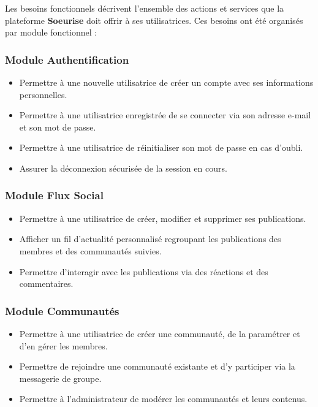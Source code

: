 \documentclass[12pt,a4paper]{report}
\begin{document}
	Les besoins fonctionnels décrivent l'ensemble des actions et services que la 
	plateforme \textbf{Soeurise} doit offrir à ses utilisatrices. Ces besoins ont été 
	organisés par module fonctionnel :
	
	\subsubsection*{Module Authentification}
	\begin{itemize}
		\item Permettre à une nouvelle utilisatrice de créer un compte avec ses 
		informations personnelles.
		\item Permettre à une utilisatrice enregistrée de se connecter via son 
		adresse e-mail et son mot de passe.
		\item Permettre à une utilisatrice de réinitialiser son mot de passe 
		en cas d'oubli.
		\item Assurer la déconnexion sécurisée de la session en cours.
	\end{itemize}
	
	\subsubsection*{Module Flux Social}
	\begin{itemize}
		\item Permettre à une utilisatrice de créer, modifier et supprimer 
		ses publications.
		\item Afficher un fil d'actualité personnalisé regroupant les publications 
		des membres et des communautés suivies.
		\item Permettre d'interagir avec les publications via des réactions 
		et des commentaires.
	\end{itemize}
	
	\subsubsection*{Module Communautés}
	\begin{itemize}
		\item Permettre à une utilisatrice de créer une communauté, de la 
		paramétrer et d'en gérer les membres.
		\item Permettre de rejoindre une communauté existante et d'y participer 
		via la messagerie de groupe.
		\item Permettre à l'administrateur de modérer les communautés et 
		leurs contenus.
	\end{itemize}
	
\end{document}
